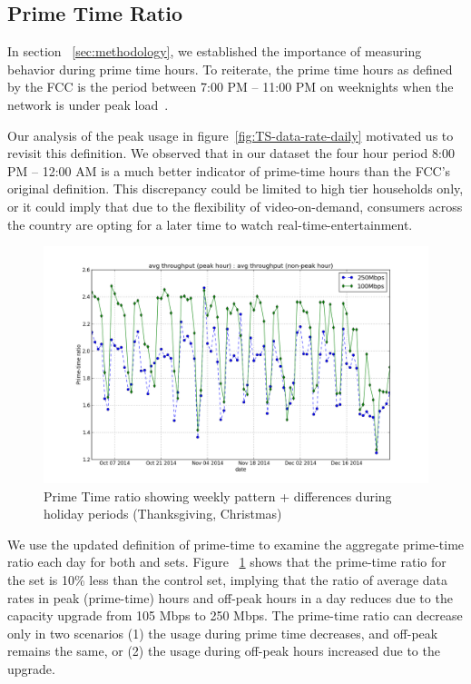 \subsection{Prime Time Ratio}
\label{subsec:primetime}

In section ~\ref{sec:methodology}, we established the importance of measuring
behavior during prime time hours. To reiterate, the prime time hours as defined
by the FCC is the period between 7:00 PM -- 11:00 PM on weeknights when the network
is under peak load~\cite{fcc2014measuring-broadband}. 

Our analysis of the peak usage in figure~\ref{fig:TS-data-rate-daily} motivated
us to revisit this definition. We observed that in our dataset the four hour
period 8:00 PM -- 12:00 AM is a much better indicator of prime-time hours than the
FCC's original definition. This discrepancy could be limited to high tier households
only, or it could imply that due to the flexibility of video-on-demand, consumers across
the country are opting for a later time to watch real-time-entertainment. 

\begin{figure}[ht!]
\begin{minipage}{\linewidth}
\centering
\includegraphics[width=\linewidth]{figures/prime-time-ratio-by-date[replace].png}
\caption{Prime Time ratio showing weekly pattern + differences during holiday periods (Thanksgiving, Christmas)}
\label{fig:TS-prime-time-ratio}
\end{minipage}
\end{figure}

We use the updated definition of prime-time to examine the aggregate prime-time
ratio each day for both \test and \control sets. Figure ~\ref{fig:TS-prime-time-ratio}
shows that the prime-time ratio for the \test set is 10\% less than the control set,
implying that the ratio of average data rates in peak (prime-time) hours and off-peak
hours in a day reduces due to the capacity upgrade from 105 Mbps to 250 Mbps. 
The prime-time ratio can decrease only in two scenarios (1) the usage during prime time
decreases, and off-peak remains the same, or (2) the usage during off-peak hours
increased due to the upgrade.

